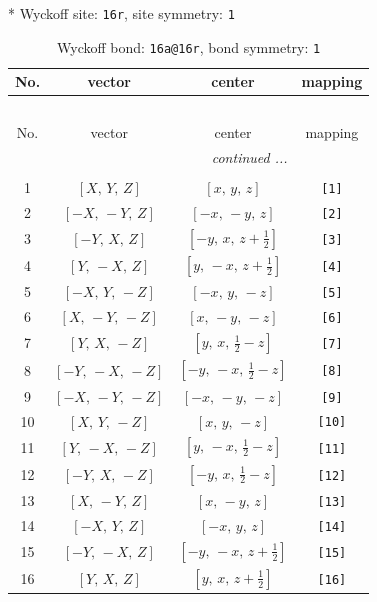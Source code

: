 \documentclass[fleqn,8pt]{jsarticle}
\begin{document}
* Wyckoff site: {\tt 16r}, site symmetry: {\tt 1}
\renewcommand{\arraystretch}{1.2}
\begin{longtable}{cccc}
\caption{Wyckoff bond: {\tt 16a@16r}, bond symmetry: {\tt 1}}
 \\
 \hline \hline
No. & vector & center & mapping \\ \hline \endfirsthead

\multicolumn{3}{l}{\tablename\ \thetable{}} \\
 \hline \hline
No. & vector & center & mapping \\ \hline \endhead

 \hline \hline
\multicolumn{3}{r}{\footnotesize\it continued ...} \\ \endfoot

 \hline \hline
\multicolumn{3}{r}{} \\ \endlastfoot

1 & $\left[ X,\, Y,\, Z \right]$ & $\left[ x,\, y,\, z \right]$ & {\tt [1]} \\ \hline
2 & $\left[ - X,\, - Y,\, Z \right]$ & $\left[ - x,\, - y,\, z \right]$ & {\tt [2]} \\ \hline
3 & $\left[ - Y,\, X,\, Z \right]$ & $\left[ - y,\, x,\, z + \frac{1}{2} \right]$ & {\tt [3]} \\ \hline
4 & $\left[ Y,\, - X,\, Z \right]$ & $\left[ y,\, - x,\, z + \frac{1}{2} \right]$ & {\tt [4]} \\ \hline
5 & $\left[ - X,\, Y,\, - Z \right]$ & $\left[ - x,\, y,\, - z \right]$ & {\tt [5]} \\ \hline
6 & $\left[ X,\, - Y,\, - Z \right]$ & $\left[ x,\, - y,\, - z \right]$ & {\tt [6]} \\ \hline
7 & $\left[ Y,\, X,\, - Z \right]$ & $\left[ y,\, x,\, \frac{1}{2} - z \right]$ & {\tt [7]} \\ \hline
8 & $\left[ - Y,\, - X,\, - Z \right]$ & $\left[ - y,\, - x,\, \frac{1}{2} - z \right]$ & {\tt [8]} \\ \hline
9 & $\left[ - X,\, - Y,\, - Z \right]$ & $\left[ - x,\, - y,\, - z \right]$ & {\tt [9]} \\ \hline
10 & $\left[ X,\, Y,\, - Z \right]$ & $\left[ x,\, y,\, - z \right]$ & {\tt [10]} \\ \hline
11 & $\left[ Y,\, - X,\, - Z \right]$ & $\left[ y,\, - x,\, \frac{1}{2} - z \right]$ & {\tt [11]} \\ \hline
12 & $\left[ - Y,\, X,\, - Z \right]$ & $\left[ - y,\, x,\, \frac{1}{2} - z \right]$ & {\tt [12]} \\ \hline
13 & $\left[ X,\, - Y,\, Z \right]$ & $\left[ x,\, - y,\, z \right]$ & {\tt [13]} \\ \hline
14 & $\left[ - X,\, Y,\, Z \right]$ & $\left[ - x,\, y,\, z \right]$ & {\tt [14]} \\ \hline
15 & $\left[ - Y,\, - X,\, Z \right]$ & $\left[ - y,\, - x,\, z + \frac{1}{2} \right]$ & {\tt [15]} \\ \hline
16 & $\left[ Y,\, X,\, Z \right]$ & $\left[ y,\, x,\, z + \frac{1}{2} \right]$ & {\tt [16]} \\
\end{longtable}
\end{document}
